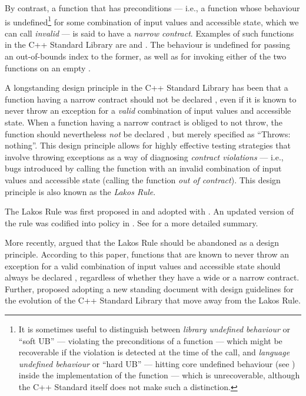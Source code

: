 By contrast, a function that has preconditions --- i.e., a function whose behaviour is undefined\footnote{It is sometimes useful to distinguish between \emph{library undefined behaviour} or ``soft UB''  --- violating the preconditions of a function --- which might be recoverable if the violation is detected at the time of the call, and \emph{language undefined behaviour} or ``hard UB'' --- hitting core undefined behaviour (see \cite{P1705R1}) inside the implementation of the function --- which is unrecoverable, although the C++ Standard itself does not make such a distinction.} for some combination of input values and accessible state, which we can call \emph{invalid} --- is said to have a \emph{narrow contract}. Examples of such functions in the C++ Standard Library are  and . The behaviour is undefined for passing an out-of-bounds index to the former, as well as for invoking either of the two functions on an empty .

A longstanding design principle in the C++ Standard Library has been that a function having a narrow contract should not be declared , even if it is known to never throw an exception for a \emph{valid} combination of input values and accessible state. When a function having a narrow contract is obliged to not throw, the function should nevertheless \emph{not} be declared , but merely specified as ``Throws: nothing''. This design principle allows for highly effective testing strategies that involve throwing exceptions as a way of diagnosing \emph{contract violations} --- i.e., bugs introduced by calling the function with an invalid combination of input values and accessible state (calling the function \emph{out of contract}). This design principle is also known as the \emph{Lakos Rule}.

The Lakos Rule was first proposed in \cite{N3248} and adopted with \cite{N3279}. An updated version of the rule was codified into policy in \cite{P0884R0}. See \cite{O'Dwyer2018} for a more detailed summary.

More recently, \cite{P1656R2} argued that the Lakos Rule should be abandoned as a design principle. According to this paper, functions that are known to never throw an exception for a valid combination of input values and accessible state should always be declared , regardless of whether they have a wide or a narrow contract. Further, \cite{P2148R0} proposed adopting a new standing document with design guidelines for the evolution of the C++ Standard Library that move away from the Lakos Rule.

